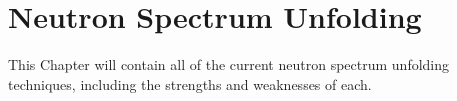 \chapter{Neutron Spectrum Unfolding}\label{chap_chap2}
This Chapter will contain all of the current neutron spectrum unfolding techniques, including the strengths and weaknesses of each.






